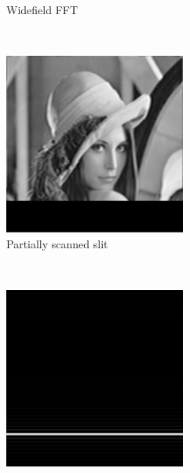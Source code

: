 \begin{figure}[h]
\begin{subfigure}[t]{0.23\textwidth}
      \caption{Widefield \gls{FFT}}
  \end{subfigure}\\
  \begin{subfigure}[t]{0.23\textwidth}
      \centering
      \includegraphics[width=\textwidth]{widefield_slit/slitscanned_partial}
      \caption{Partially scanned slit}
  \end{subfigure}~
  \begin{subfigure}[t]{0.23\textwidth}
      \centering
      \includegraphics[width=\textwidth]{widefield_slit/illiumination_partial}

\end{subfigure}
\end{figure}
